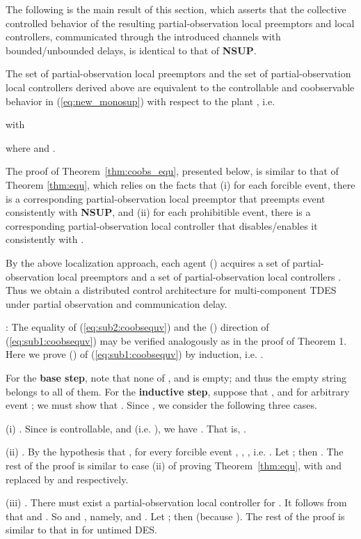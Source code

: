 The following is the main result of this section, which asserts that the collective controlled
behavior of the resulting partial-observation local preemptors and local controllers, communicated
through the introduced channels with bounded/unbounded delays, is identical to that of {\bf NSUP}.

\begin{theorem} \label{thm:coobs_equ}
The set of partial-observation local preemptors  and the set of partial-observation local
controllers  derived above
are equivalent to the controllable and coobservable behavior  in (\ref{eq:new_monosup}) with respect to
the plant , i.e.

with

where 
and .
\end{theorem}

The proof of Theorem~\ref{thm:coobs_equ}, presented below, is similar to that of Theorem
\ref{thm:equ}, which relies on the facts that (i) for each forcible
event, there is a corresponding partial-observation local preemptor that
preempts event  consistently with {\bf NSUP}, and (ii)
for each prohibitible event, there is a corresponding partial-observation
local controller that disables/enables it consistently with
. 

By the above localization approach, each agent  () acquires
a set of partial-observation local preemptors 
and a set of partial-observation local controllers .
Thus we obtain a distributed control architecture for multi-component TDES under partial observation and communication delay.

\vspace{2em}
: The equality of (\ref{eq:sub2:coobsequv}) and the ()
direction of (\ref{eq:sub1:coobsequv}) may be verified analogously
as in the proof of Theorem 1. Here we prove () of (\ref{eq:sub1:coobsequv})
by induction, i.e. .

For the {\bf base step}, note that none of ,  and
 is empty; and thus the empty string  belongs to all
of them. For the {\bf inductive step}, suppose that ,  and  for arbitrary event ; we must show that . Since , we consider the following three cases.

(i) . Since  is controllable, and
 (i.e. ), we have
. That is, .

(ii) . By the hypothesis that ,
for every forcible event , ,
, i.e. . Let ; then . The rest of the proof is similar to
case (ii) of proving Theorem~\ref{thm:equ}, with  and 
replaced by  and  respectively.


(iii) . There must exist a partial-observation local
controller  for . It follows from  that  and
. So  and ,
namely,  and . Let ; then
 (because ).
The rest of the proof is similar to that
in \cite{ZhangCW17} for untimed DES. \hfill 









